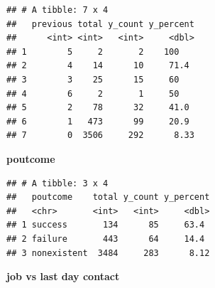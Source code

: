 \documentclass[
]{article}
\newenvironment{Shaded}{\begin{snugshade}}{\end{snugshade}}
\newcommand{\AttributeTok}[1]{\textcolor[rgb]{0.13,0.29,0.53}{#1}}
\newcommand{\ConstantTok}[1]{\textcolor[rgb]{0.56,0.35,0.01}{#1}}
\newcommand{\DecValTok}[1]{\textcolor[rgb]{0.00,0.00,0.81}{#1}}
\newcommand{\FunctionTok}[1]{\textcolor[rgb]{0.13,0.29,0.53}{\textbf{#1}}}
\newcommand{\NormalTok}[1]{#1}
\newcommand{\OtherTok}[1]{\textcolor[rgb]{0.56,0.35,0.01}{#1}}
\newcommand{\SpecialCharTok}[1]{\textcolor[rgb]{0.81,0.36,0.00}{\textbf{#1}}}
\newcommand{\StringTok}[1]{\textcolor[rgb]{0.31,0.60,0.02}{#1}}
\begin{document}
\begin{verbatim}
## # A tibble: 7 x 4
##   previous total y_count y_percent
##      <int> <int>   <int>     <dbl>
## 1        5     2       2    100   
## 2        4    14      10     71.4 
## 3        3    25      15     60   
## 4        6     2       1     50   
## 5        2    78      32     41.0 
## 6        1   473      99     20.9 
## 7        0  3506     292      8.33
\end{verbatim}

\textbf{poutcome}

\begin{Shaded}
\end{Shaded}

\begin{verbatim}
## # A tibble: 3 x 4
##   poutcome    total y_count y_percent
##   <chr>       <int>   <int>     <dbl>
## 1 success       134      85     63.4 
## 2 failure       443      64     14.4 
## 3 nonexistent  3484     283      8.12
\end{verbatim}

\textbf{job vs last day contact}
\end{document}
